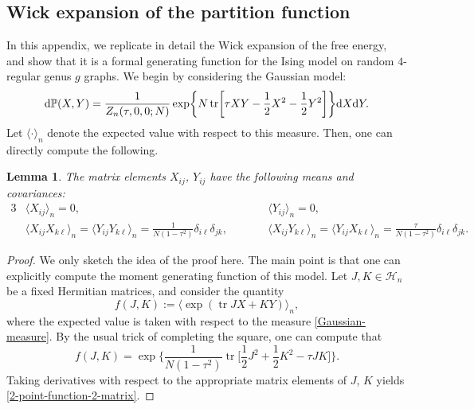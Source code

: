 \documentclass[pdftex]{sigma}
\DeclareMathOperator{\tr}{tr}
\numberwithin{equation}{section}
\newtheorem{Lemma}[Theorem]{Lemma}
\begin{document}
\subsection{Wick expansion of the partition function}\label{Genus0-A}
In this appendix, we replicate in detail the Wick expansion of the free energy, and show that it
is a formal generating function for the Ising model on random $4$-regular genus $g$ graphs.
We begin by considering the Gaussian model:
 \begin{equation}\label{Gaussian-measure}
 {\rm d}\mathbb{P}(X,Y) = \frac{1}{Z_n(\tau,0,0;N)}\exp \biggl\{N\tr\biggl[\tau XY - \frac{1}{2}X^2 -\frac{1}{2}Y^2\biggr]\biggr\} {\rm d}X{\rm d}Y.
 \end{equation}
Let $\langle\cdot\rangle_n$ denote the expected value with respect to this measure. Then, one can directly compute the following.
\begin{Lemma}The matrix elements $X_{ij}$, $Y_{ij}$
have the following means and covariances:
 \begin{alignat}{3}
 &\langle X_{ij} \rangle_n = 0, && \langle Y_{ij} \rangle_n = 0,&\label{2-point-function-2-matrix}\\
 &\langle X_{ij}X_{k\ell}\rangle_n = \langle Y_{ij}Y_{k\ell}\rangle_n = \frac{1}{N(1-\tau^2)} \delta_{i\ell}\delta_{jk},\qquad &&
 \langle X_{ij}Y_{k\ell}\rangle_n =\langle Y_{ij}X_{k\ell}\rangle_n = \frac{\tau}{N(1-\tau^2)} \delta_{i\ell}\delta_{jk}.&\nonumber
 \end{alignat}
\end{Lemma}
\begin{proof}
 We only sketch the idea of the proof here. The main point is that one can explicitly compute the moment generating function of this model.
 Let $J, K \in \mathcal{H}_n$ be a fixed Hermitian matrices, and consider the quantity
 \begin{equation*}
 f(J, K) := \langle \exp (\tr J X + K Y) \rangle_n,
 \end{equation*}
 where the expected value is taken with respect to the measure \eqref{Gaussian-measure}. By the usual trick of completing the square, one can compute that
 \begin{equation*}
 f(J,K) = \exp\biggl\{\frac{1}{N(1-\tau^2)}\tr\biggl[\frac{1}{2}J^2 + \frac{1}{2}K^2 -\tau JK\biggr]\biggr\}.
 \end{equation*}
 Taking derivatives with respect to the appropriate matrix elements of $J$, $K$ yields \eqref{2-point-function-2-matrix}.
\end{proof}
\end{document}
